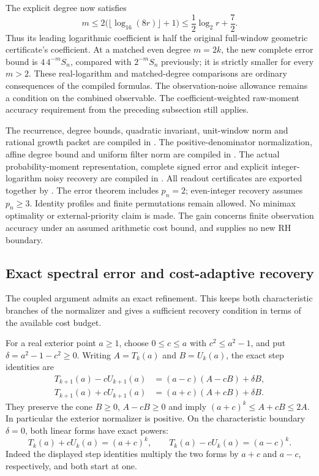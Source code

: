 \documentclass[11pt]{article}
\theoremstyle{definition}
\begin{document}
The explicit degree now satisfies
\[
 m\le2\bigl(\lfloor\log_{16}(8r)\rfloor+1\bigr)
   \le\frac12\log_2r+\frac72.
\]
Thus its leading logarithmic coefficient is half the original
full-window geometric certificate's coefficient.
At a matched even degree $m=2k$, the new complete error bound is
$4\,4^{-m}S_n$, compared with $2^{-m}S_n$ previously; it is strictly
smaller for every $m>2$. These real-logarithm and matched-degree
comparisons are ordinary consequences of the compiled formulas.
The observation-noise allowance remains a condition on the combined
observable. The coefficient-weighted raw-moment accuracy requirement
from the preceding subsection still applies.

\begin{flushleft}
The recurrence, degree bounds, quadratic invariant, unit-window norm
and rational growth packet are compiled in
.
The positive-denominator normalization, affine degree bound and
uniform filter norm are compiled in
.
The actual probability-moment representation, complete signed error
and explicit integer-logarithm noisy recovery are compiled in
.
All readout certificates are exported together by
.
The error theorem includes $p_n=2$; even-integer recovery assumes
$p_n\ge3$. Identity profiles and finite permutations remain allowed.
No minimax optimality or external-priority claim is made.
The gain concerns finite observation accuracy under an assumed
arithmetic cost bound, and supplies no new RH boundary.
\end{flushleft}

\subsection{Exact spectral error and cost-adaptive recovery}

The coupled argument admits an exact refinement. This keeps both
characteristic branches of the normalizer and gives a sufficient recovery
condition in terms of the available cost budget.

For a real exterior point $a\ge1$, choose $0\le c\le a$ with
$c^2\le a^2-1$, and put $\delta=a^2-1-c^2\ge0$.
Writing $A=T_k(a)$ and $B=U_k(a)$, the exact step identities are
\[
\begin{split}
 T_{k+1}(a)-cU_{k+1}(a)
   &=(a-c)(A-cB)+\delta B,\\
 T_{k+1}(a)+cU_{k+1}(a)
   &=(a+c)(A+cB)+\delta B.
\end{split}
\]
They preserve the cone $B\ge0$, $A-cB\ge0$ and imply
$(a+c)^k\le A+cB\le2A$. In particular the exterior normalizer
is positive. On the characteristic boundary $\delta=0$, both
linear forms have exact powers:
\[
 T_k(a)+cU_k(a)=(a+c)^k,\qquad
 T_k(a)-cU_k(a)=(a-c)^k.
\]
Indeed the displayed step identities multiply the two forms by
$a+c$ and $a-c$, respectively, and both start at one.
\end{document}

